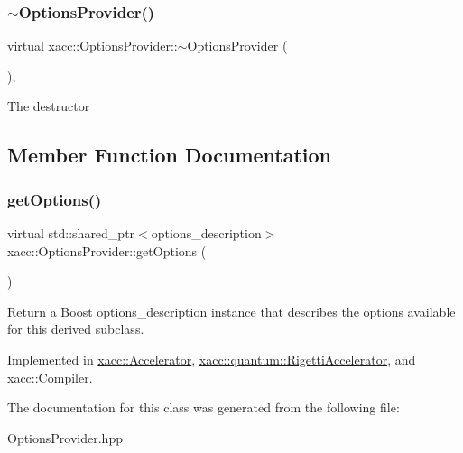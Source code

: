 \subsubsection{\texorpdfstring{$\sim$\+Options\+Provider()}{~OptionsProvider()}}
{\footnotesize\ttfamily virtual xacc\+::\+Options\+Provider\+::$\sim$\+Options\+Provider (\begin{DoxyParamCaption}{ }\end{DoxyParamCaption})\hspace{0.3cm}{\ttfamily [inline]}, {\ttfamily [virtual]}}

The destructor 

\subsection{Member Function Documentation}
\mbox{\label{a02536_a6d150954f852109bfe2c1ae90222926f}} 
\subsubsection{\texorpdfstring{get\+Options()}{getOptions()}}
{\footnotesize\ttfamily virtual std\+::shared\+\_\+ptr$<$options\+\_\+description$>$ xacc\+::\+Options\+Provider\+::get\+Options (\begin{DoxyParamCaption}{ }\end{DoxyParamCaption})\hspace{0.3cm}{\ttfamily [pure virtual]}}

Return a Boost options\+\_\+description instance that describes the options available for this derived subclass. 

Implemented in \hyperlink{a02432_a98c9eda6b54367c75667ecfbbf167979}{xacc\+::\+Accelerator}, \hyperlink{a01212_a9ee9e62aecbccf193894ca3388676f9f}{xacc\+::quantum\+::\+Rigetti\+Accelerator}, and \hyperlink{a02448_a9f5a8965c9c2dd895016d18264ebbe92}{xacc\+::\+Compiler}.



The documentation for this class was generated from the following file\+:\begin{DoxyCompactItemize}
\item 
Options\+Provider.\+hpp\end{DoxyCompactItemize}
